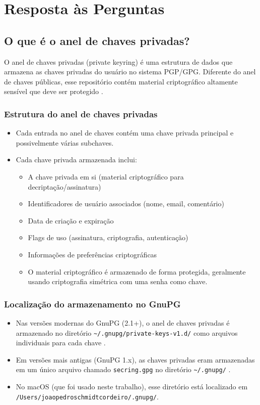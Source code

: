 \chapter{Resposta às Perguntas}

\section{O que é o anel de chaves privadas?}
O anel de chaves privadas (private keyring) é uma estrutura de dados que armazena as chaves privadas do usuário no sistema PGP/GPG. Diferente do anel de chaves públicas, esse repositório contém material criptográfico altamente sensível que deve ser protegido \cite{gnupgprivate}.

\subsection{Estrutura do anel de chaves privadas}
\begin{itemize}
    \item Cada entrada no anel de chaves contém uma chave privada principal e possivelmente várias subchaves.
    \item Cada chave privada armazenada inclui:
    \begin{itemize}
        \item A chave privada em si (material criptográfico para decriptação/assinatura)
        \item Identificadores de usuário associados (nome, email, comentário)
        \item Data de criação e expiração
        \item Flags de uso (assinatura, criptografia, autenticação)
        \item Informações de preferências criptográficas
        \item O material criptográfico é armazenado de forma protegida, geralmente usando criptografia simétrica com uma senha como chave.
    \end{itemize}
\end{itemize}

\subsection{Localização do armazenamento no GnuPG}
\begin{itemize}
    \item Nas versões modernas do GnuPG (2.1+), o anel de chaves privadas é armazenado no diretório \texttt{\~{}/.gnupg/private-keys-v1.d/} como arquivos individuais para cada chave \cite{gnupgprivate}.
    \item Em versões mais antigas (GnuPG 1.x), as chaves privadas eram armazenadas em um único arquivo chamado \texttt{secring.gpg} no diretório \texttt{\~{}/.gnupg/} \cite{gnupgdoc}.
    \item No macOS (que foi usado neste trabalho), esse diretório está localizado em \texttt{/Users/joaopedroschmidtcordeiro/.gnupg/}.
\end{itemize}

